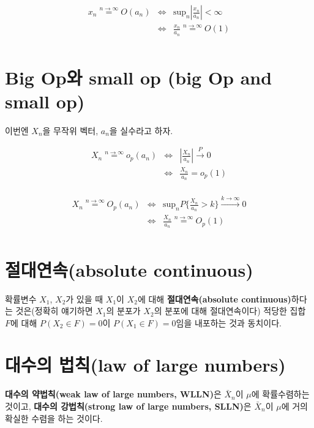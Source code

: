 \documentclass[b5paper,]{scrbook}
\theoremstyle{plain}
\theoremstyle{definition}
\numberwithin{equation}{section}
\let\BeginKnitrBlock\begin \let\EndKnitrBlock\end
\begin{document}
\begin{eqnarray*}
x_{n}\stackrel{n\rightarrow \infty}{=}O(a_{n}) &\Leftrightarrow& \text{sup}_{n}|\frac{x_{n}}{a_{n}}| < \infty \\
&\Leftrightarrow& \frac{x_{n}}{a_{n}}\stackrel{n\rightarrow \infty}{=}O(1)\\
\end{eqnarray*}

\section{Big Op와 small op (big Op and small
op)}\label{big-op-small-op-big-op-and-small-op}

이번엔 \(X_{n}\)을 무작위 벡터, \(a_{n}\)을 실수라고 하자.

\begin{eqnarray*}
X_{n}\stackrel{n\rightarrow \infty}{=}o_{p}(a_{n}) &\Leftrightarrow& |\frac{X_{n}}{a_{n}}|\stackrel{P}{\rightarrow}0 \\
&\Leftrightarrow& \frac{X_{n}}{a_{n}}=o_{p}(1)\\
\end{eqnarray*}

\begin{eqnarray*}
X_{n}\stackrel{n\rightarrow \infty}{=}O_{p}(a_{n}) &\Leftrightarrow& \text{sup}_{n} P\{ \frac{X_{n}}{a_{n}}>k\}\stackrel{k\rightarrow\infty}{\rightarrow}0 \\
&\Leftrightarrow& \frac{X_{n}}{a_{n}}\stackrel{n\rightarrow \infty}{=}O_{p}(1)\\
\end{eqnarray*}

\section{절대연속(absolute continuous)}\label{absolute-continuous}

확률변수 \(X_{1}\), \(X_{2}\)가 있을 때 \(X_{1}\)이 \(X_{2}\)에 대해
\textbf{절대연속(absolute continuous)}하다는 것은(정확히 얘기하면
\(X_{1}\)의 분포가 \(X_{2}\)의 분포에 대해 절대연속이다) 적당한 집합
\(F\)에 대해 \(P(X_{2}\in F)=0\)이 \(P(X_{1}\in F)=0\)임을 내포하는 것과
동치이다.

\section{대수의 법칙(law of large numbers)}\label{-law-of-large-numbers}

\BeginKnitrBlock{proposition}[대수의 약법칙과 대수의 강법칙]
\protect\hypertarget{prp:unnamed-chunk-70}{}{\label{prp:unnamed-chunk-70}
{} }\textbf{대수의
약법칙(weak law of large numbers, WLLN)}은 \(\bar{X}_{n}\)이 \(\mu\)에
확률수렴하는 것이고, \textbf{대수의 강법칙(strong law of large numbers,
SLLN)}은 \(\bar{X}_{n}\)이 \(\mu\)에 거의 확실한 수렴을 하는 것이다.
\EndKnitrBlock{proposition}
\end{document}
